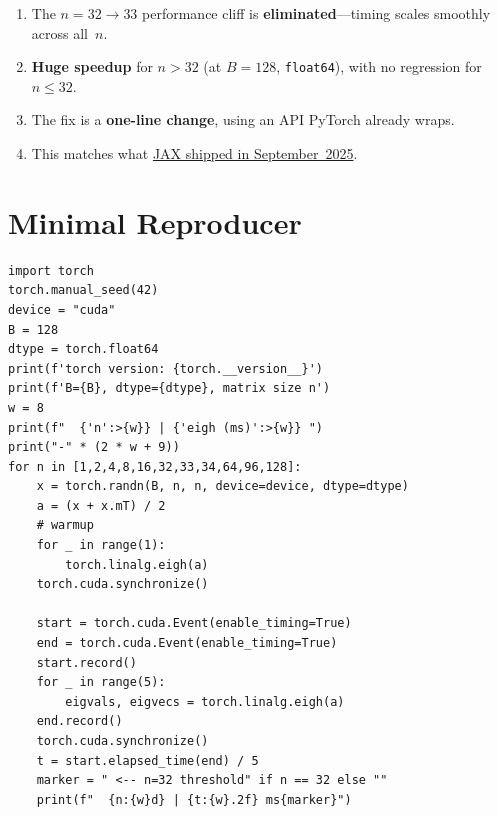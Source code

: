 \documentclass[10pt, letterpaper]{article}
\begin{document}
\begin{enumerate}
    \item The $n = 32 \to 33$ performance cliff is \textbf{eliminated}---timing scales smoothly across all~$n$.
    \item \textbf{Huge speedup} for $n > 32$ (at $B=128$, \texttt{float64}), with no
    regression for $n \le 32$.
    \item The fix is a \textbf{one-line change}, using an API PyTorch already wraps.
    \item This matches what
    \href{https://github.com/jax-ml/jax/pull/31375}{JAX shipped in
    September~2025}.
\end{enumerate}


\newpage
\appendix
\section{Minimal Reproducer}
\label{app:reproducer}

\begin{lstlisting}[style=python]
import torch
torch.manual_seed(42)
device = "cuda"
B = 128
dtype = torch.float64
print(f'torch version: {torch.__version__}')
print(f'B={B}, dtype={dtype}, matrix size n')
w = 8
print(f"  {'n':>{w}} | {'eigh (ms)':>{w}} ")
print("-" * (2 * w + 9))
for n in [1,2,4,8,16,32,33,34,64,96,128]:
    x = torch.randn(B, n, n, device=device, dtype=dtype)
    a = (x + x.mT) / 2
    # warmup
    for _ in range(1):
        torch.linalg.eigh(a)
    torch.cuda.synchronize()
    
    start = torch.cuda.Event(enable_timing=True)
    end = torch.cuda.Event(enable_timing=True)
    start.record()
    for _ in range(5):
        eigvals, eigvecs = torch.linalg.eigh(a)
    end.record()
    torch.cuda.synchronize()
    t = start.elapsed_time(end) / 5
    marker = " <-- n=32 threshold" if n == 32 else ""
    print(f"  {n:{w}d} | {t:{w}.2f} ms{marker}")
\end{lstlisting}
\end{document}
